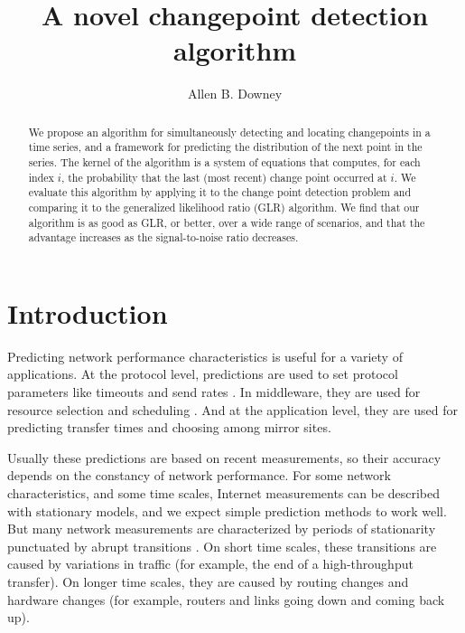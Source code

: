 \documentclass[twocolumn,11pt]{article}
\begin{document}
\title{A novel changepoint detection algorithm}

\author{Allen B. Downey}

\date{}

\maketitle

\begin{abstract}

We propose an algorithm for simultaneously detecting and locating
changepoints in a time series, and a framework for predicting the
distribution of the next point in the series.  The kernel of the
algorithm is a system of equations that computes, for each index $i$,
the probability that the last (most recent) change point occurred at
$i$.  We evaluate this algorithm by applying it to the change point
detection problem and comparing it to the generalized likelihood ratio
(GLR) algorithm.  We find that our algorithm is as good as GLR, or
better, over a wide range of scenarios, and that the advantage
increases as the signal-to-noise ratio decreases.

\end{abstract}

\section{Introduction}
\label {intro}

Predicting network performance characteristics is useful for a variety
of applications.  At the protocol level, predictions are used to
set protocol parameters like timeouts and send rates
\cite{noureddine02transmission}.  In middleware, they are used for
resource selection and scheduling \cite{wolski99network}. And at the
application level, they are used for predicting transfer times and
choosing among mirror sites.

Usually these predictions are based on recent measurements, so their
accuracy depends on the constancy of network performance.  For some
network characteristics, and some time scales, Internet measurements
can be described with stationary models, and we expect simple
prediction methods to work well.  But many network measurements are
characterized by periods of stationarity punctuated by abrupt
transitions \cite{zhang01constancy} \cite{karagiannis04nonstationary}.
On short time scales, these transitions are caused by variations in
traffic (for example, the end of a high-throughput transfer).  On
longer time scales, they are caused by routing changes and
hardware changes (for example, routers and links going down and coming
back up).
\end{document}
